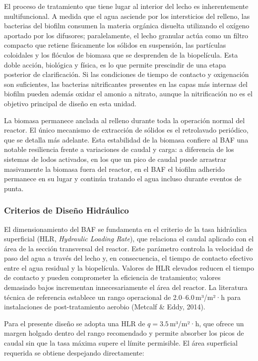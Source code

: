 \documentclass[12pt,a4paper]{article}
\begin{document}
El proceso de tratamiento que tiene lugar al interior del lecho es inherentemente multifuncional. A medida que el agua asciende por los intersticios del relleno, las bacterias del biofilm consumen la materia orgánica disuelta utilizando el oxígeno aportado por los difusores; paralelamente, el lecho granular actúa como un filtro compacto que retiene físicamente los sólidos en suspensión, las partículas coloidales y los flóculos de biomasa que se desprenden de la biopelícula. Esta doble acción, biológica y física, es lo que permite prescindir de una etapa posterior de clarificación. Si las condiciones de tiempo de contacto y oxigenación son suficientes, las bacterias nitrificantes presentes en las capas más internas del biofilm pueden además oxidar el amonio a nitrato, aunque la nitrificación no es el objetivo principal de diseño en esta unidad.

La biomasa permanece anclada al relleno durante toda la operación normal del reactor. El único mecanismo de extracción de sólidos es el retrolavado periódico, que se detalla más adelante. Esta estabilidad de la biomasa confiere al BAF una notable resiliencia frente a variaciones de caudal y carga: a diferencia de los sistemas de lodos activados, en los que un pico de caudal puede arrastrar masivamente la biomasa fuera del reactor, en el BAF el biofilm adherido permanece en su lugar y continúa tratando el agua incluso durante eventos de punta.

\subsubsection*{Criterios de Diseño Hidráulico}

El dimensionamiento del BAF se fundamenta en el criterio de la tasa hidráulica superficial (HLR, \textit{Hydraulic Loading Rate}), que relaciona el caudal aplicado con el área de la sección transversal del reactor. Este parámetro controla la velocidad de paso del agua a través del lecho y, en consecuencia, el tiempo de contacto efectivo entre el agua residual y la biopelícula. Valores de HLR elevados reducen el tiempo de contacto y pueden comprometer la eficiencia de tratamiento; valores demasiado bajos incrementan innecesariamente el área del reactor. La literatura técnica de referencia establece un rango operacional de 2.0--6.0\,m³/m²·h para instalaciones de post-tratamiento aerobio (Metcalf \& Eddy, 2014).

Para el presente diseño se adopta una HLR de $q = 3.5$\,m³/m²·h, que ofrece un margen holgado dentro del rango recomendado y permite absorber los picos de caudal sin que la tasa máxima supere el límite permisible. El área superficial requerida se obtiene despejando directamente:
\end{document}
